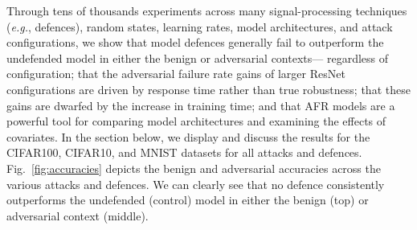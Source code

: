 Through tens of thousands experiments across many signal-processing techniques (\textit{e.g.}, defences), random states, learning rates, model architectures, and attack configurations, we show that model defences generally fail to outperform the undefended model in either the benign or adversarial contexts--- regardless of configuration; that the adversarial failure rate gains of larger ResNet configurations are driven by response time rather than true robustness; that these gains are dwarfed by the increase in training time; and that AFR models are a powerful tool for comparing model architectures and examining the effects of covariates. In the section below, we display and discuss the results for the CIFAR100, CIFAR10, and MNIST datasets for all attacks and defences. Fig.~\ref{fig:accuracies} depicts the benign and adversarial accuracies across the various attacks and defences. We can clearly see that no defence consistently outperforms the undefended (control) model in either the benign (top) or adversarial context (middle).





